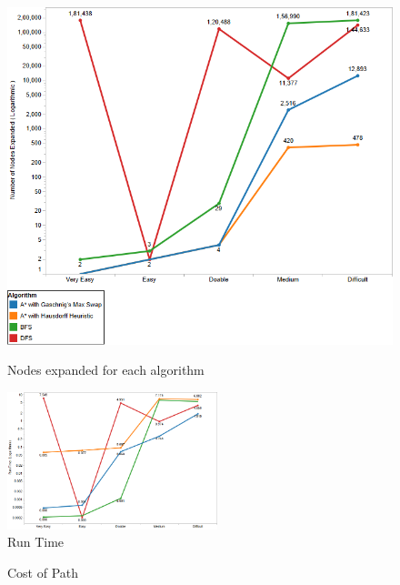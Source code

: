 \documentclass{svproc}
\begin{document}
\begin{figure}[!tbp]
	\centering
	\begin{minipage}[b]{0.5\textwidth}
		\includegraphics[width=\textwidth]{Images/Nodes_expanded.png}
		\caption{Nodes expanded for each algorithm}
	\end{minipage}
	\hfill
	\begin{minipage}[b]{0.4\textwidth}
		\includegraphics[width=\textwidth, height=4cm]{Images/RunningTime.png}
		\caption{Run Time}
	\end{minipage}
\end{figure}
\begin{figure}
    \centering
    \caption{Cost of Path}
    \label{fig:my_label}
\end{figure}
\end{document}
